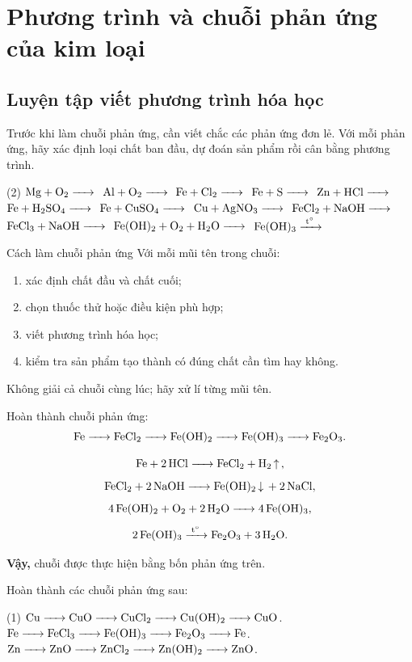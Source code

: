 \section{Phương trình và chuỗi phản ứng của kim loại}

\subsection{Luyện tập viết phương trình hóa học}

Trước khi làm chuỗi phản ứng, cần viết chắc các phản ứng đơn lẻ. Với mỗi phản ứng, hãy xác định loại chất ban đầu, dự đoán sản phẩm rồi cân bằng phương trình.

\begin{tasks}(2)
\task $\ce{Mg + O2 ->}$
\task $\ce{Al + O2 ->}$
\task $\ce{Fe + Cl2 ->}$
\task $\ce{Fe + S ->}$
\task $\ce{Zn + HCl ->}$
\task $\ce{Fe + H2SO4 ->}$
\task $\ce{Fe + CuSO4 ->}$
\task $\ce{Cu + AgNO3 ->}$
\task $\ce{FeCl2 + NaOH ->}$
\task $\ce{FeCl3 + NaOH ->}$
\task $\ce{Fe(OH)2 + O2 + H2O ->}$
\task $\ce{Fe(OH)3 ->[t^\circ]}$
\end{tasks}

\begin{ghinho}{Cách làm chuỗi phản ứng}
Với mỗi mũi tên trong chuỗi:
\begin{enumerate}
\item xác định chất đầu và chất cuối;
\item chọn thuốc thử hoặc điều kiện phù hợp;
\item viết phương trình hóa học;
\item kiểm tra sản phẩm tạo thành có đúng chất cần tìm hay không.
\end{enumerate}
Không giải cả chuỗi cùng lúc; hãy xử lí từng mũi tên.
\end{ghinho}

\begin{vidu}
Hoàn thành chuỗi phản ứng:
\[
\ce{Fe -> FeCl2 -> Fe(OH)2 -> Fe(OH)3 -> Fe2O3}.
\]
\end{vidu}
\begin{loigiai}
\[
\ce{Fe + 2HCl -> FeCl2 + H2 ^},
\]
\[
\ce{FeCl2 + 2NaOH -> Fe(OH)2 v + 2NaCl},
\]
\[
\ce{4Fe(OH)2 + O2 + 2H2O -> 4Fe(OH)3},
\]
\[
\ce{2Fe(OH)3 ->[t^\circ] Fe2O3 + 3H2O}.
\]

\textbf{Vậy,} chuỗi được thực hiện bằng bốn phản ứng trên.
\end{loigiai}

\begin{tuluyen}
Hoàn thành các chuỗi phản ứng sau:
\begin{tasks}(1)
\task $\ce{Cu -> CuO -> CuCl2 -> Cu(OH)2 -> CuO}$.
\task $\ce{Fe -> FeCl3 -> Fe(OH)3 -> Fe2O3 -> Fe}$.
\task $\ce{Zn -> ZnO -> ZnCl2 -> Zn(OH)2 -> ZnO}$.
\end{tasks}
\end{tuluyen}


